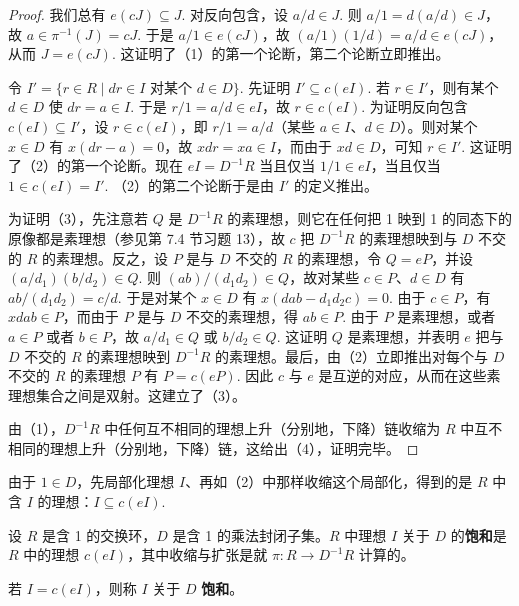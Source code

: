 \begin{proof}
我们总有 \(e(cJ) \subseteq J\). 对反向包含，设 \(a/d \in J\). 则 \(a/1 = d(a/d) \in J\)，故 \(a \in \pi^{-1}(J) = cJ\). 于是 \(a/1 \in e(cJ)\)，故 \((a/1)(1/d) = a/d \in e(cJ)\)，从而 \(J = e(cJ)\). 这证明了（1）的第一个论断，第二个论断立即推出。

令 \(I' = \{r \in R \mid dr \in I \text{ 对某个 } d \in D\}\). 先证明 \(I' \subseteq c(eI)\). 若 \(r \in I'\)，则有某个 \(d \in D\) 使 \(dr = a \in I\). 于是 \(r/1 = a/d \in eI\)，故 \(r \in c(eI)\). 为证明反向包含 \(c(eI) \subseteq I'\)，设 \(r \in c(eI)\)，即 \(r/1 = a/d\)（某些 \(a \in I\)、\(d \in D\)）。则对某个 \(x \in D\) 有 \(x(dr-a) = 0\)，故 \(xdr = xa \in I\)，而由于 \(xd \in D\)，可知 \(r \in I'\). 这证明了（2）的第一个论断。现在 \(eI = D^{-1}R\) 当且仅当 \(1/1 \in eI\)，当且仅当 \(1 \in c(eI) = I'\). （2）的第二个论断于是由 \(I'\) 的定义推出。

为证明（3），先注意若 \(Q\) 是 \(D^{-1}R\) 的素理想，则它在任何把 1 映到 1 的同态下的原像都是素理想（参见第 7.4 节习题 13），故 \(c\) 把 \(D^{-1}R\) 的素理想映到与 \(D\) 不交的 \(R\) 的素理想。反之，设 \(P\) 是与 \(D\) 不交的 \(R\) 的素理想，令 \(Q = eP\)，并设 \((a/d_1)(b/d_2) \in Q\). 则 \((ab)/(d_1d_2) \in Q\)，故对某些 \(c \in P\)、\(d \in D\) 有 \(ab/(d_1d_2) = c/d\). 于是对某个 \(x \in D\) 有 \(x(dab-d_1d_2c) = 0\). 由于 \(c \in P\)，有 \(xdab \in P\)，而由于 \(P\) 是与 \(D\) 不交的素理想，得 \(ab \in P\). 由于 \(P\) 是素理想，或者 \(a \in P\) 或者 \(b \in P\)，故 \(a/d_1 \in Q\) 或 \(b/d_2 \in Q\). 这证明 \(Q\) 是素理想，并表明 \(e\) 把与 \(D\) 不交的 \(R\) 的素理想映到 \(D^{-1}R\) 的素理想。最后，由（2）立即推出对每个与 \(D\) 不交的 \(R\) 的素理想 \(P\) 有 \(P = c(eP)\). 因此 \(c\) 与 \(e\) 是互逆的对应，从而在这些素理想集合之间是双射。这建立了（3）。

由（1），\(D^{-1}R\) 中任何互不相同的理想上升（分别地，下降）链收缩为 \(R\) 中互不相同的理想上升（分别地，下降）链，这给出（4），证明完毕。
\end{proof}

由于 \(1 \in D\)，先局部化理想 \(I\)、再如（2）中那样收缩这个局部化，得到的是 \(R\) 中含 \(I\) 的理想：\(I \subseteq c(eI)\).

\begin{definition}
设 \(R\) 是含 1 的交换环，\(D\) 是含 1 的乘法封闭子集。\(R\) 中理想 \(I\) 关于 \(D\) 的\textbf{饱和}是 \(R\) 中的理想 \(c(eI)\)，其中收缩与扩张是就 \(\pi : R \to D^{-1}R\) 计算的。

若 \(I = c(eI)\)，则称 \(I\) 关于 \(D\) \textbf{饱和}。
\end{definition}

